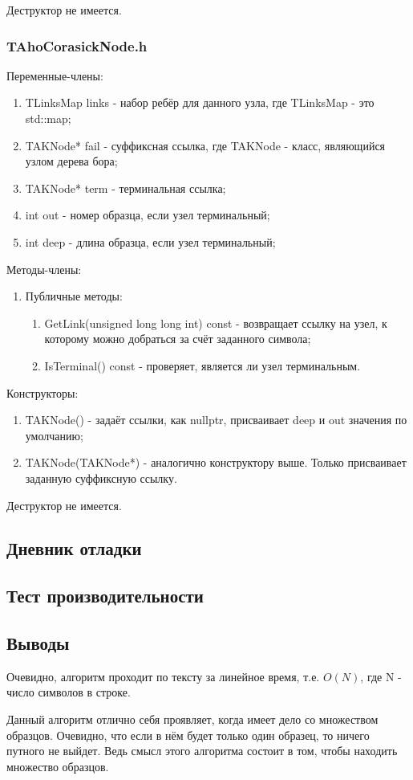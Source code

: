 \documentclass[12pt]{article}
\begin{document}
Деструктор не имеется.

\subsubsection*{TAhoCorasickNode.h}

Переменные-члены:
\begin{enumerate}
	\item TLinksMap links - набор ребёр для данного узла, где TLinksMap - это std::map;
	\item TAKNode*  fail - суффиксная ссылка, где TAKNode - класс, являющийся узлом дерева бора;
	\item TAKNode*  term - терминальная ссылка;
	\item int out - номер образца, если узел терминальный;
	\item int deep - длина образца, если узел терминальный;
\end{enumerate}

Методы-члены:
\begin{enumerate}
	\item Публичные методы:
	\begin{enumerate}
		\item GetLink(unsigned long long int) const - возвращает ссылку на узел, к которому можно добраться за счёт заданного символа;
		\item IsTerminal() const - проверяет, является ли узел терминальным.
	\end{enumerate}
\end{enumerate}


Конструкторы:
\begin{enumerate}
	\item TAKNode() - задаёт ссылки, как nullptr, присваивает deep и out значения по умолчанию;
	\item TAKNode(TAKNode*) - аналогично конструктору выше. Только присваивает заданную суффиксную ссылку.
\end{enumerate}

Деструктор не имеется.

\subsection*{Дневник отладки}


\subsection*{Тест производительности}


\subsection*{Выводы}
Очевидно, алгоритм проходит по тексту за линейное время, т.е. $O(N)$, где N - число символов в строке.

Данный алгоритм отлично себя проявляет, когда имеет дело со множеством образцов. Очевидно, что если в нём будет только один образец, то ничего путного не выйдет. Ведь смысл этого алгоритма состоит в том, чтобы находить множество образцов.
\end{document}
